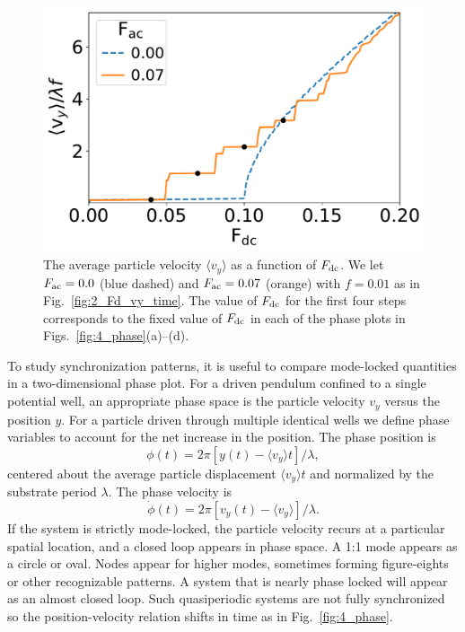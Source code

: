 \documentclass[preprint,showpacs,preprintnumbers,amsmath,amssymb,aps,prb]{revtex4-1}
\theoremstyle{remark}
\begin{document}
\begin{figure}[h]
\centering
\includegraphics[width=\columnwidth]{fig3_sweep_vyFDC.pdf}
\caption{The average particle velocity  $\langle v_{y} \rangle$
  as a function of $F_{\rm dc}$.
  We let
  $F_{\rm ac}=0.0$ (blue dashed) and 
  $F_{\rm ac}=0.07$ (orange) with $f = 0.01$ 
  as in Fig.~\ref{fig:2_Fd_vy_time}.
  The value of $F_{\rm dc}$ for the first four steps
  corresponds to the fixed value of $F_{\rm dc}$
  in each of the phase plots
  in Figs.~\ref{fig:4_phase}(a)--(d).
}
\label{fig:3_sweep_vyFDC}
\end{figure}

  To study synchronization patterns, 
  it is useful to compare
  mode-locked quantities 
  in a two-dimensional phase plot. 
  For a driven pendulum confined to a single potential well,
  an appropriate
  phase space is the particle velocity $v_y$ versus the position $y$.  
  For a particle driven 
  through multiple identical wells 
  we define phase variables 
  to account for the net increase in the position.
  The phase position is
  \begin{equation}
    \phi(t) = 2\pi [y(t)-\langle v_y \rangle t]/\lambda,
  \end{equation}
  centered about the average particle displacement $\langle v_y \rangle t$
  and normalized by the substrate period $\lambda$.\cite{Juniper2015}
  The phase velocity is
  \begin{equation}
    \dot{\phi}(t) =2\pi [v_y(t)-\langle v_y \rangle] /\lambda.  
  \end{equation}
If the system
  is strictly mode-locked,
  the particle velocity
  recurs at a particular spatial location, and 
a closed loop appears in  
  phase space. 
  A 1:1 mode appears as a circle or oval. 
  Nodes appear 
  for higher modes,
  sometimes forming figure-eights
  or other recognizable patterns.
  A system that is nearly phase locked
  will appear as an almost closed loop.
  Such quasiperiodic systems are
  not fully synchronized
  so the position-velocity relation
  shifts in time as in Fig.~\ref{fig:4_phase}.
  
\end{document}
